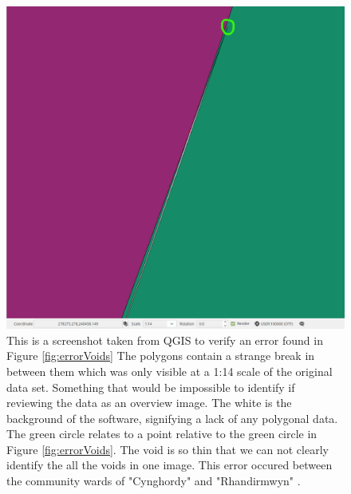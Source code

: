 \begin{figure}
\includegraphics[width=1\textwidth]{images/ch6/BoundarySplit2}
\caption{This is a screenshot taken from QGIS to verify an error found in Figure \ref{fig:errorVoids} The polygons contain a strange break in between them which was only visible at a 1:14 scale of the original data set. Something that would be impossible to identify if reviewing the data as an overview image. The white is the background of the software, signifying a lack of any polygonal data. The green circle relates to a point relative to the green circle in Figure \ref{fig:errorVoids}. The void is so thin that we can not clearly identify the all the voids in one image. 
This error occured between the community wards of "Cynghordy" and "Rhandirmwyn" \cite{ONS}.
 } \label{fig:splitBoundary}
\end{figure}

